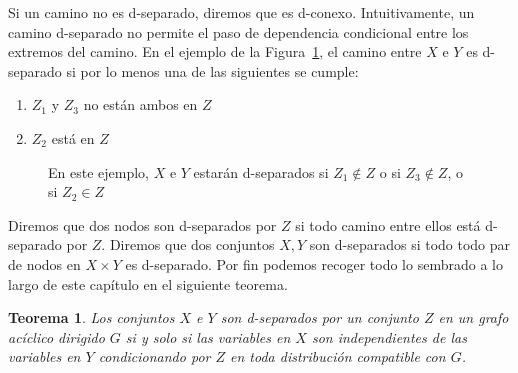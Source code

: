 \documentclass[a4paper,11pt,spanish, twoside]{tfg-uam-matematicas_25-26}
\newtheorem{teor}{Teorema}[chapter]
\theoremstyle{definition}
\begin{document}
Si un camino no es d-separado, diremos que es d-conexo. Intuitivamente, un camino d-separado no permite el paso de dependencia condicional entre los extremos del camino. En el ejemplo de la Figura~\ref{fig:d-separation-illustration}, el camino entre $X$ e $Y$ es d-separado si por lo menos una de las siguientes se cumple:
\begin{enumerate}
\item $Z_1$ y $Z_3$ no están ambos en $Z$
\item $Z_2$ está en $Z$
\end{enumerate}

\begin{figure}[h]
    \centering
{}
    \caption{En este ejemplo, $X$ e $Y$ estarán d-separados si $Z_1 \notin Z$ o si $Z_3 \notin Z$, o si $Z_2 \in Z$}
    \label{fig:d-separation-illustration}
\end{figure}

Diremos que dos nodos son d-separados por $Z$ si todo camino entre ellos está d-separado por $Z$. Diremos que dos conjuntos $X, Y$ son d-separados si todo todo par de nodos en $X \times Y$ es d-separado. Por fin podemos recoger todo lo sembrado a lo largo de este capítulo en el siguiente teorema.

\begin{teor}
Los conjuntos $X$ e $Y$ son d-separados por un conjunto $Z$ en un grafo acíclico dirigido $G$ si y solo si las variables en $X$ son independientes de las variables en $Y$ condicionando por $Z$ en toda distribución compatible con $G$.
\end{teor}
\end{document}
